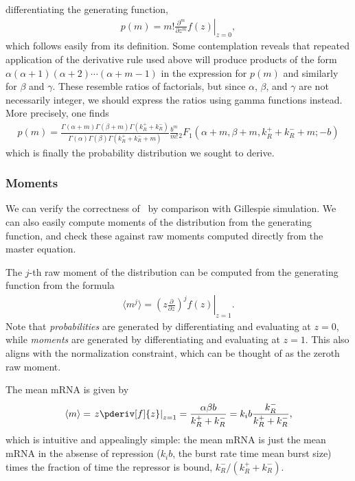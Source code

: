 differentiating the generating function,
\begin{align}
p(m) = m! \left.\frac{\partial^m}{\partial z^m} f(z) \right|_{z=0},
\end{align}
which follows easily from its definition. Some contemplation reveals
that repeated application of the derivative rule used above will produce
products of the form $\alpha(\alpha+1)(\alpha+2)\cdots(\alpha+m-1)$ in
the expression for $p(m)$ and similarly for $\beta$ and $\gamma$. These
resemble ratios of factorials, but since $\alpha$, $\beta$, and $\gamma$
are not necessarily integer, we should express the ratios using gamma
functions instead. More precisely, one finds
\begin{align}
p(m) = \frac{
        \Gamma(\alpha + m)\Gamma(\beta + m)\Gamma(k_R^+ + k_R^-)
        }
        {
        \Gamma(\alpha)\Gamma(\beta)\Gamma(k_R^+ + k_R^- + m)
        }
\frac{b^m}{m!}{_2F_1}(\alpha+m, \beta+m, k_R^++k_R^-+m; -b)
\label{eq:p_m_bursty+rep}
\end{align}
which is finally the probability distribution we sought to derive.

\subsubsection{Moments}
We can verify the correctness of~
by comparison with Gillespie simulation.
We can also easily compute moments of the distribution from
the generating function, and check these against raw moments computed
directly from the master equation.

The $j$-th raw moment of the distribution can be computed from the
generating function from the formula
\begin{align}
\langle m^j \rangle
= \left. \left(z \frac{\partial}{\partial z}\right)^j f(z)\right|_{z=1}.
\end{align}
Note that \textit{probabilities} are generated by differentiating
and evaluating at $z=0$, while \textit{moments} are generated by
differentiating and evaluating at $z=1$. This also aligns with the
normalization constraint, which can be thought of as the zeroth raw moment.
        
The mean mRNA is given by
\begin{align}
\langle m \rangle = \left.z \pderiv[f]{z} \right|_{z=1}
= \frac{\alpha\beta b}{k_R^+ + k_R^-}
= k_i b\frac{k_R^-}{k_R^+ + k_R^-},
\end{align}
which is intuitive and appealingly simple:
the mean mRNA is just the mean mRNA in the absense of repression
($k_i b$, the burst rate time mean burst size)
times the fraction of time the repressor is bound, $k_R^-/(k_R^+ + k_R^-)$.

